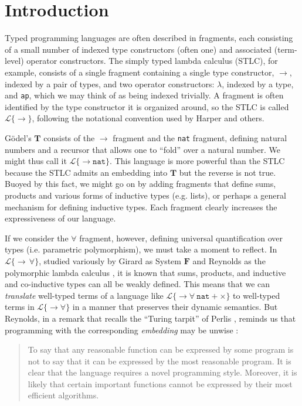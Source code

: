 \documentclass[9pt,preprint]{sigplanconf}
\begin{document}
\section{Introduction}
Typed programming languages are often described in fragments, each consisting of a small number of indexed type constructors (often one) and associated (term-level) operator constructors. The simply typed lambda calculus (STLC), for example, consists of a single fragment containing a single type constructor, $\rightarrow$, indexed by a pair of types, and two operator constructors: $\lambda$, indexed by a type, and \verb|ap|, which we may think of as being indexed trivially. A fragment is often identified by the type constructor it is organized around, so the STLC is  called $\mathcal{L}\{\rightarrow\}$, following the notational convention used by Harper \cite{pfpl} and others.

G\"odel's $\mathbf{T}$ consists of the $\rightarrow$ fragment and the \verb|nat| fragment, defining natural numbers and a recursor that allows one to ``fold'' over a natural number. We might thus call it $\mathcal{L}\{\rightarrow \mathtt{nat}\}$. This language is  more powerful than the STLC because the STLC admits an embedding  into  $\mathbf{T}$ but the reverse is not true. Buoyed by this fact, we might go on by adding fragments that define sums, products and various forms of inductive types (e.g. lists), or perhaps a general mechanism for defining inductive types. Each fragment clearly increases the expressiveness of our language.


If we consider the $\forall$ fragment, however, defining universal quantification over types (i.e. parametric polymorphism), we must take a moment to reflect. In $\mathcal{L}\{\rightarrow\,\forall\}$, studied variously by Girard as System $\mathbf{F}$ \cite{girard1971extension} and Reynolds as the polymorphic lambda calculus \cite{Reynolds94anintroduction}, it is known that sums, products, and inductive and co-inductive types can all be weakly defined. This means that we can \emph{translate} well-typed terms of a language like $\mathcal{L}\{\rightarrow\forall~\mathtt{nat} + \times\}$ to well-typed terms in $\mathcal{L}\{\rightarrow\forall\}$ in a manner that preserves their dynamic semantics. But Reynolds, in a remark that recalls the ``Turing tarpit'' of Perlis \cite{Perl82a}, reminds us that programming with the corresponding \emph{embedding} may be unwise \cite{Reynolds94anintroduction}: 
\begin{quote}
To say that any reasonable function can be expressed by some program is not to say that it can be expressed by the most reasonable program. It is clear that the language requires a novel programming style. Moreover, it is likely that certain important functions cannot be expressed by their most efficient algorithms.
\end{quote}
\end{document}
